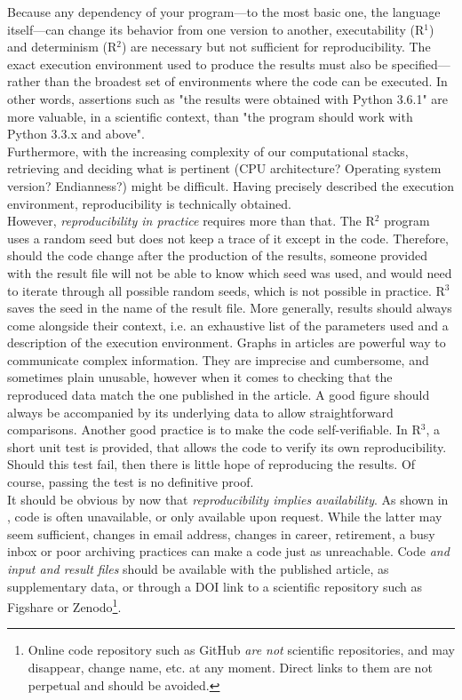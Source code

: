 \documentclass[a4paper,11pt]{article}
\begin{document}
Because any dependency of your program---to the most basic one, the language itself---can change its behavior from one version to another, executability (R$^1$) and determinism (R$^2$) are necessary but not sufficient for reproducibility. The exact execution environment used to produce the results must also be specified---rather than the broadest set of environments where the code can be executed. In other words, assertions such as "the results were obtained with Python 3.6.1" are more valuable, in a scientific context, than "the program should work with Python 3.3.x and above".\\

Furthermore, with the increasing complexity of our computational stacks, retrieving and deciding what is pertinent (CPU architecture? Operating system version? Endianness?) might be difficult.
Having precisely described the execution environment, reproducibility is technically obtained.\\ 

However, \emph{reproducibility in practice} requires more than that.
%
The R$^2$ program uses a random seed but does not keep a trace of it except in the code. Therefore, should the code change after the production of the results, someone provided with the result file will not be able to know which seed was used, and would need to iterate through all possible random seeds, which is not possible in practice. R$^3$ saves the seed in the name of the result file. More generally, results should always come alongside their context, i.e. an exhaustive list of the parameters used and a description of the execution environment.
%
Graphs in articles are powerful way to communicate complex information. They are imprecise and cumbersome, and sometimes plain unusable, however when it comes to checking that the reproduced data match the one published in the article. A good figure should always be accompanied by its underlying data to allow straightforward comparisons.
%
Another good practice is to make the code self-verifiable. In R$^3$, a short unit test is provided, that allows the code to verify its own reproducibility. Should this test fail, then there is little hope of reproducing the results. Of course, passing the test is no definitive proof.\\

It should be obvious by now that \emph{reproducibility implies availability}. As shown in \citep{Collberg:2016}, code is often unavailable, or only available upon request. While the latter may seem sufficient, changes in email address, changes in career, retirement, a busy inbox or poor archiving practices can make a code just as unreachable. Code \emph{and input and result files} should be available with the published article, as supplementary data, or through a DOI link to a scientific repository such as Figshare or Zenodo\footnote{Online code repository such as GitHub \emph{are not} scientific repositories, and may disappear, change name, etc. at any moment. Direct links to them are not perpetual and should be avoided.}.\\
\end{document}
